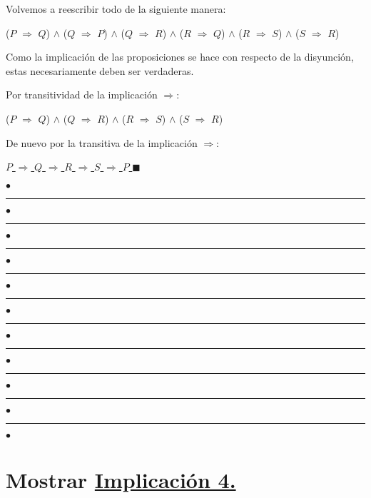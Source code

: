 \documentclass[12pt]{article}
\renewcommand{\qedsymbol}{$\blacksquare$}
\begin{document}
Volvemos a reescribir todo de la siguiente manera: \vspace{0.5cm}

{\normalsize{($P$ $\Longrightarrow$ $Q$) $\wedge$ ($Q$ $\Longrightarrow$ $P$) $\wedge$ ($Q$ $\Longrightarrow$ $R$) $\wedge$ ($R$ $\Longrightarrow$ $Q$) $\wedge$ ($R$ $\Longrightarrow$ $S$) $\wedge$ ($S$ $\Longrightarrow$ $R$)}} 

Como la implicación de las proposiciones se hace con respecto de la disyunción, estas necesariamente deben ser verdaderas. {\vspace{0.5cm}}

{\textcolor{carrotorange}{Por transitividad de la  {\textcolor{pakistangreen}{implicación}}}} {\textcolor{vividviolet}{{\Large{$\Longrightarrow$}}}}:  \vspace{0.5cm}

{\normalsize{($P$ $\Longrightarrow$ $Q$) $\wedge$  ($Q$ $\Longrightarrow$ $R$) $\wedge$  ($R$ $\Longrightarrow$ $S$) $\wedge$ ($S$ $\Longrightarrow$ $R$)}} \vspace{0.5cm}

{\textcolor{carrotorange}{De nuevo por la transitiva de la 
{\textcolor{pakistangreen}{implicación}}}} {\textcolor{vividviolet}{{\Large{$\Longrightarrow$}}}}:  \vspace{0.5cm}

{\underline
    {
        {\normalsize{$P$ $\Longrightarrow$ $Q$ $\Longrightarrow$ $R$ $\Longrightarrow$ $S$ $\Longrightarrow$ $P$}} 
    }
}   \hspace{0.5cm}  \qedsymbol \vspace{0.7cm}

\begin{center}
{\textcolor{trueblue}
{
$\bullet$  \rule{10mm}{0.3mm} $\bullet$ \rule{10mm}{0.3mm} $\bullet$ \rule{10mm}{0.3mm}  $\bullet$  \rule{10mm}{0.3mm} $\bullet$ \rule{10mm}{0.3mm} $\bullet$ \rule{10mm}{0.3mm}  $\bullet$  \rule{10mm}{0.3mm}  $\bullet$  \rule{10mm}{0.3mm}  $\bullet$  \rule{10mm}{0.3mm} $\bullet$ \rule{10mm}{0.3mm} $\bullet$ }
}
\end{center} \vspace{0.5cm}



\section{Mostrar {} {} {\textcolor{pakistangreen}{{\underline{Implicación 4.}}}}} \vspace{.5cm}
\end{document}
